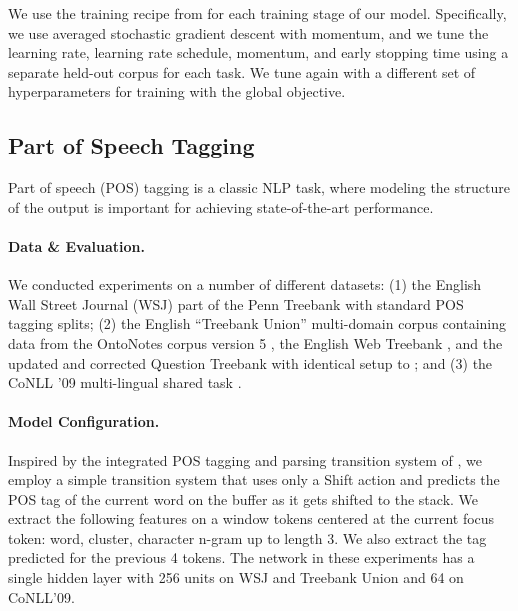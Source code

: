 \documentclass[11pt]{article}
\begin{document}
We use the training recipe from  for each training
stage of our model. Specifically, we use averaged stochastic gradient descent
with momentum, and we tune the learning rate, learning rate schedule,
momentum, and early stopping time using a separate held-out corpus for each
task. We tune again with a different set of hyperparameters for training with
the global objective. 

\subsection{Part of Speech Tagging}
\label{subsection:tagging}

Part of speech (POS) tagging is a classic NLP task,
where modeling the structure of the output
is important for achieving state-of-the-art performance.

\paragraph{Data \& Evaluation.}

We conducted experiments on a number of different datasets:
(1) the English Wall Street Journal (WSJ) part
of the Penn Treebank \cite{marcus:1993:CL}
with standard POS tagging splits;
(2) the English ``Treebank Union'' multi-domain corpus containing
data from the OntoNotes corpus version 5 \cite{hovy-EtAl:2006:NAACL},
the English Web Treebank \cite{petrov-mcdonald:2012:SANCL}, and the
updated and corrected Question Treebank \cite{judge-etAl:2006:ACL}
with identical setup to ; and
(3) the CoNLL '09 multi-lingual shared 
task \cite{hajic-EtAl:2009:CoNLL}.

\paragraph{Model Configuration.}

Inspired by the integrated POS tagging and parsing transition 
system of , 
we employ a simple transition system that uses only a {\sc Shift} action and 
predicts the POS tag of the current word on the buffer
as it gets shifted to the stack. 
We extract the following features on a window  tokens centered
at the current focus token: word, cluster, character n-gram up to length 3.
We also extract the tag predicted for the previous 4 tokens.
The network in these experiments has a single hidden layer with
256 units on WSJ and Treebank Union and 64 on CoNLL'09.
\end{document}
